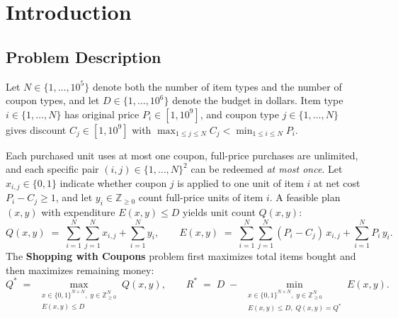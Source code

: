 \documentclass[10pt, a4paper]{article}
\begin{document}
\section{Introduction}

\subsection{Problem Description}
Let $N \in \{1, \ldots, 10^5\}$ denote both the number of item types and the number of coupon types, and let $D \in \{1, \ldots, 10^6\}$ denote the budget in dollars. Item type $i \in \{1, \ldots, N\}$ has original price $P_i \in [1, 10^9]$, and coupon type $j \in \{1, \ldots, N\}$ gives discount $C_j \in [1, 10^9]$ with $\max_{1 \le j \le N} C_j < \min_{1 \le i \le N} P_i$.

Each purchased unit uses at most one coupon, full-price purchases are unlimited, and each specific pair $(i, j) \in \{1, \ldots, N\}^2$ can be redeemed \emph{at most once}. Let $x_{i,j} \in \{0, 1\}$ indicate whether coupon $j$ is applied to one unit of item $i$ at net cost $P_i - C_j \ge 1$, and let $y_i \in \mathbb{Z}_{\ge 0}$ count full-price units of item $i$. A feasible plan $(x, y)$ with expenditure $E(x, y) \le D$ yields unit count $Q(x, y)$:
\begin{equation}
  Q(x, y) \;=\; \sum_{i=1}^{N} \sum_{j=1}^{N} x_{i,j} + \sum_{i=1}^{N} y_i,
  \qquad
  E(x, y) \;=\; \sum_{i=1}^{N} \sum_{j=1}^{N} (P_i - C_j)\, x_{i,j} + \sum_{i=1}^{N} P_i\, y_i.
  \label{eq:quantity-cost}
\end{equation}
The \textbf{Shopping with Coupons} problem first maximizes total items bought and then maximizes remaining money:
\begin{equation}
  Q^* \;=\; \max_{\substack{x \in \{0,1\}^{N \times N},\; y \in \mathbb{Z}_{\ge 0}^N \\ E(x, y) \le D}} Q(x, y),
  \qquad
  R^* \;=\; D \;-\; \min_{\substack{x \in \{0,1\}^{N \times N},\; y \in \mathbb{Z}_{\ge 0}^N \\ E(x, y) \le D,\; Q(x, y) = Q^*}} E(x, y).
  \label{eq:lex-opt}
\end{equation}
\end{document}
